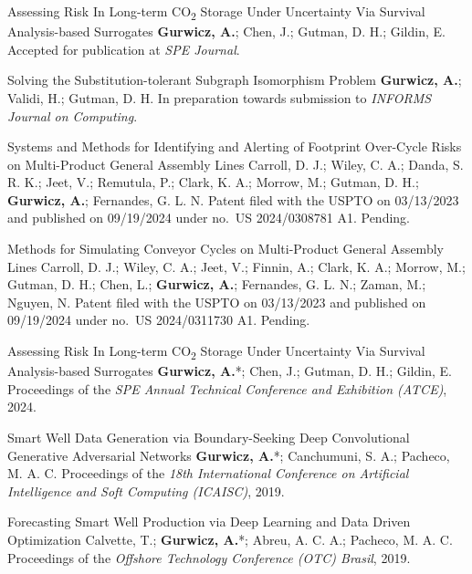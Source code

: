 
\cvpublication
    {Assessing Risk In Long-term CO\textsubscript{2} Storage Under Uncertainty Via Survival Analysis-based Surrogates}
    {\textbf{Gurwicz, A.}; Chen, J.; Gutman, D. H.; Gildin, E.}
    {Accepted for publication at \textit{SPE Journal}.}

\cvpublication
    {Solving the Substitution-tolerant Subgraph Isomorphism Problem}
    {\textbf{Gurwicz, A.}; Validi, H.; Gutman, D. H.}
    {In preparation towards submission to \textit{INFORMS Journal on Computing}.}


\cvpublication
    {Systems and Methods for Identifying and Alerting of Footprint Over-Cycle Risks on Multi-Product General Assembly
    Lines}
    {Carroll, D. J.; Wiley, C. A.; Danda, S. R. K.; Jeet, V.; Remutula, P.; Clark, K. A.; Morrow, M.; Gutman, D. H.;
    \textbf{Gurwicz, A.}; Fernandes, G. L. N.}
    {Patent filed with the USPTO on 03/13/2023 and published on 09/19/2024 under no.\ US 2024/0308781 A1. Pending.}

\cvpublication
    {Methods for Simulating Conveyor Cycles on Multi-Product General Assembly Lines}
    {Carroll, D. J.; Wiley, C. A.; Jeet, V.; Finnin, A.; Clark, K. A.; Morrow, M.; Gutman, D. H.; Chen, L.;
    \textbf{Gurwicz, A.}; Fernandes, G. L. N.; Zaman, M.; Nguyen, N.}
    {Patent filed with the USPTO on 03/13/2023 and published on 09/19/2024 under no.\ US 2024/0311730 A1. Pending.}


\cvpublication
    {Assessing Risk In Long-term CO\textsubscript{2} Storage Under Uncertainty Via Survival Analysis-based Surrogates}
    {\textbf{Gurwicz, A.}*; Chen, J.; Gutman, D. H.; Gildin, E.}
    {Proceedings of the \textit{SPE Annual Technical Conference and Exhibition (ATCE)}, 2024.
    }

\cvpublication
    {Smart Well Data Generation via Boundary-Seeking Deep Convolutional Generative Adversarial Networks}
    {\textbf{Gurwicz, A.}*; Canchumuni, S. A.; Pacheco, M. A. C.}
    {Proceedings of the \textit{18th International Conference on Artificial Intelligence and Soft Computing (ICAISC)},
    2019. }

\cvpublication
    {Forecasting Smart Well Production via Deep Learning and Data Driven Optimization}
    {Calvette, T.; \textbf{Gurwicz, A.}*; Abreu, A. C. A.; Pacheco, M. A. C.}
    {Proceedings of the \textit{Offshore Technology Conference (OTC) Brasil}, 2019. }

